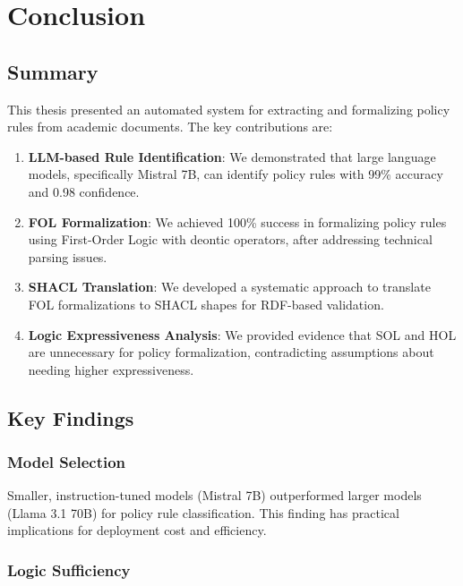 \chapter{Conclusion}
\label{ch:conclusion}

\section{Summary}

This thesis presented an automated system for extracting and formalizing policy rules from academic documents. The key contributions are:

\begin{enumerate}
    \item \textbf{LLM-based Rule Identification}: We demonstrated that large language models, specifically Mistral 7B, can identify policy rules with 99\% accuracy and 0.98 confidence.
    
    \item \textbf{FOL Formalization}: We achieved 100\% success in formalizing policy rules using First-Order Logic with deontic operators, after addressing technical parsing issues.
    
    \item \textbf{SHACL Translation}: We developed a systematic approach to translate FOL formalizations to SHACL shapes for RDF-based validation.
    
    \item \textbf{Logic Expressiveness Analysis}: We provided evidence that SOL and HOL are unnecessary for policy formalization, contradicting assumptions about needing higher expressiveness.
\end{enumerate}

\section{Key Findings}

\subsection{Model Selection}

Smaller, instruction-tuned models (Mistral 7B) outperformed larger models (Llama 3.1 70B) for policy rule classification. This finding has practical implications for deployment cost and efficiency.

\subsection{Logic Sufficiency}

